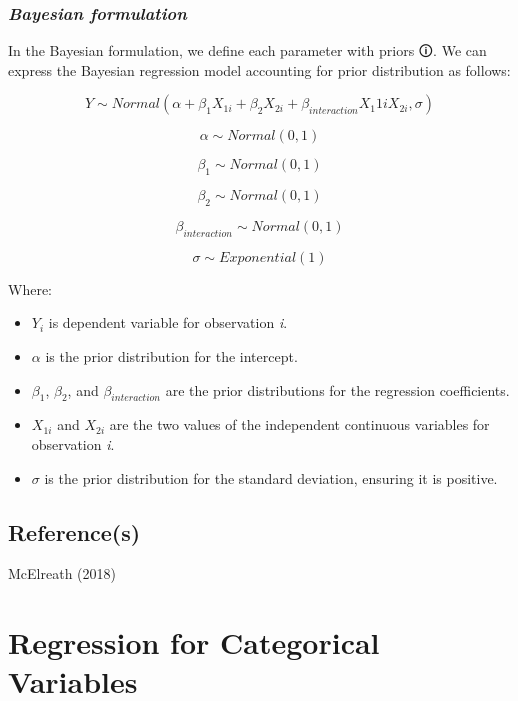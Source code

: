 \documentclass[
  letterpaper,
  DIV=11,
  numbers=noendperiod]{scrreprt}
\begin{document}
\subsection{\texorpdfstring{\emph{Bayesian
formulation}}{Bayesian formulation}}\label{bayesian-formulation-2}

In the Bayesian formulation, we define each parameter with
\label{prior}{{priors 🛈}}. We can express the Bayesian
regression model accounting for prior distribution as follows:

\[
Y \sim Normal(\alpha +  \beta_1  X_{1i}​ + \beta_2  X_{2i}​​ + \beta_{interaction}  X_1{1i} X_{2i}​ ,  \sigma)
\]

\[
\alpha \sim Normal(0,1)
\]

\[
\beta_1 \sim Normal(0,1)
\]

\[
\beta_2 \sim Normal(0,1)
\]

\[
\beta_{interaction} \sim Normal(0,1)
\]

\[
σ \sim Exponential(1)
\]

Where:

\begin{itemize}
\item
  \(Y_i\) is dependent variable for observation \emph{i}.
\item
  \(\alpha\) is the prior distribution for the intercept.
\item
  \(\beta_1\), \(\beta_2\), and \(\beta_{interaction}\) are the prior
  distributions for the regression coefficients.
\item
  \(X_{1i}\) and \(X_{2i}\) are the two values of the independent
  continuous variables for observation \emph{i}.
\item
  \(\sigma\) is the prior distribution for the standard deviation,
  ensuring it is positive.
\end{itemize}

\section{Reference(s)}\label{references-2}

McElreath (2018)


\chapter{Regression for Categorical
Variables}\label{regression-for-categorical-variables}
\end{document}
